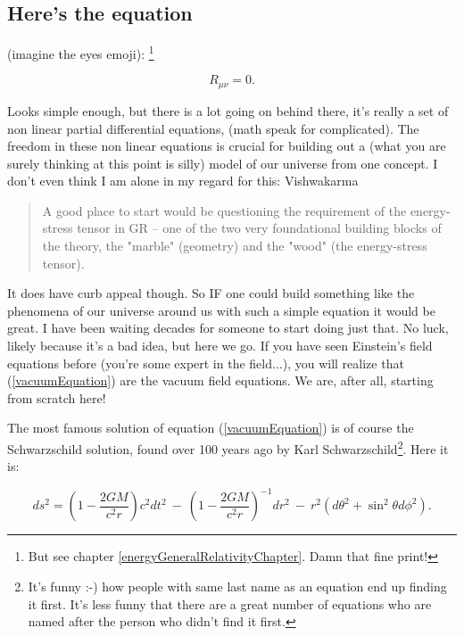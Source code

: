 \documentclass[../rzero]{subfiles}
\begin{document}
\subsection{Here's the equation}

	(imagine the eyes emoji): \footnote{But see chapter \ref{energyGeneralRelativityChapter}. Damn that fine print!} 
	

\begin{equation}\label{vacuumEquation} 
R_{\mu\nu} = 0 .  
\end{equation}

Looks simple enough, but there is a lot going on behind there, it's really a set of non linear partial differential equations, (math speak for complicated). The freedom in these non linear equations is crucial for building out a (what you are surely thinking at this point is silly) model of our universe from one concept. I don't even think I am alone in my regard for this: Vishwakarma\cite{vishwakarmaEinsteinCriticalPerspective2016}\cite{vishwakarmaMysteriesRikNovel2014}
\begin{quotation}
	A good place to start would be questioning the requirement of the energy-stress tensor in GR – one of the two very foundational building blocks of the theory, the "marble" (geometry) and the "wood" (the energy-stress tensor).
	\end{quotation}

It does have curb appeal though. So IF one could build something like the phenomena of our universe around us with such a simple equation it would be great. I have been waiting decades for someone to start doing just that. No luck, likely because it's a bad idea, but here we go. If you have seen Einstein's field equations before (you're some expert in the field$\ldots$), you will realize that (\ref{vacuumEquation}) are the vacuum field equations. We are, after all, starting from scratch here!

The most famous solution of equation (\ref{vacuumEquation}) is of course the Schwarzschild solution, found over 100 years ago by Karl Schwarzschild\footnote{It's funny :-) how people with same last name as an equation end up finding it first. It's less funny that there are a great number of equations who are named after the person who didn't find it first.}\cite{schwarzschildGravitationalFieldMass1999}. Here it is:

\begin{equation}
	d s^2=\left(1-\frac{2 G M}{c^2 r}\right) c^2 d t^2\ -\ \left(1-\frac{2 G M}{c^2 r}\right)^{-1} d r^2\ -\ r^2\left(d \theta^2+\sin ^2 \theta d \phi^2\right) .
\end{equation}
\end{document}
